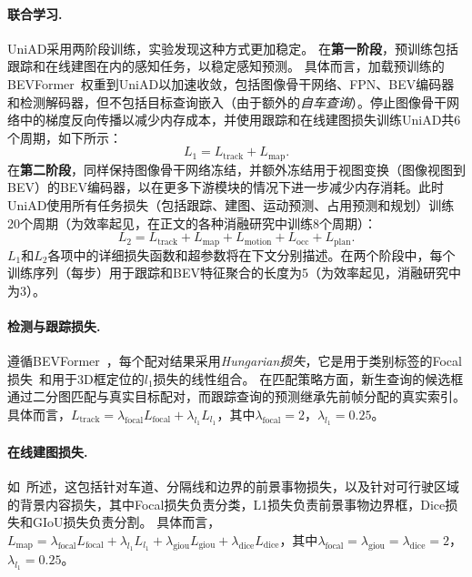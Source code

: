 \documentclass[10pt,twocolumn,letterpaper]{article}
\begin{document}
\paragraph{联合学习.}
UniAD采用两阶段训练，实验发现这种方式更加稳定。
在\textbf{第一阶段}，预训练包括跟踪和在线建图在内的感知任务，以稳定感知预测。
%
具体而言，加载预训练的BEVFormer~\cite{li2022bevformer}权重到UniAD以加速收敛，包括图像骨干网络、FPN、BEV编码器和检测解码器，但不包括目标查询嵌入（由于额外的\textit{自车查询}）。停止图像骨干网络中的梯度反向传播以减少内存成本，并使用跟踪和在线建图损失训练UniAD共6个周期，如下所示：
%
\begin{equation}
\label{eq:all-loss-1}
    L_1 = L_{\text{track}} + L_{\text{map}}.
\end{equation}
%
在\textbf{第二阶段}，同样保持图像骨干网络冻结，并额外冻结用于视图变换（图像视图到BEV）的BEV编码器，以在更多下游模块的情况下进一步减少内存消耗。此时UniAD使用所有任务损失（包括跟踪、建图、运动预测、占用预测和规划）训练20个周期（为效率起见，在正文的各种消融研究中训练8个周期）：
%
\begin{equation}
\label{eq:all-loss}
    L_2 = L_{\text{track}} + L_{\text{map}} + L_{\text{motion}} + L_{\text{occ}} + L_{\text{plan}}.
\end{equation}
%
$L_1$和$L_2$各项中的详细损失函数和超参数将在下文分别描述。在两个阶段中，每个训练序列（每步）用于跟踪和BEV特征聚合\cite{li2022bevformer}的长度为5（为效率起见，消融研究中为3）。


\paragraph{检测与跟踪损失.} 遵循BEVFormer~\cite{li2022bevformer}，每个配对结果采用\textit{Hungarian损失}，它是用于类别标签的Focal损失~\cite{lin2017focal}和用于3D框定位的$l_1$损失的线性组合。
%
在匹配策略方面，新生查询的候选框通过二分图匹配与真实目标配对，而跟踪查询的预测继承先前帧分配的真实索引。
%
具体而言，$L_{\text{track}} = \lambda_{\text{focal}} L_{\text{focal}} + \lambda_{l_1} L_{l_1}$，其中$\lambda_{\text{focal}}\!=\!2$，$\lambda_{l_1}\!=\!0.25$。

\paragraph{在线建图损失.} 如~\cite{li2022panopticseg}所述，这包括针对车道、分隔线和边界的前景事物损失，以及针对可行驶区域的背景内容损失，其中Focal损失负责分类，L1损失负责前景事物边界框，Dice损失和GIoU损失\cite{rezatofighi2019giou}负责分割。
%
具体而言，$L_{\text{map}} = \lambda_{\text{focal}} L_{\text{focal}} + \lambda_{l_1} L_{l_1} + \lambda_{\text{giou}} L_{\text{giou}} + \lambda_{\text{dice}} L_{\text{dice}}$，其中$\lambda_{\text{focal}}\!=\!\lambda_{\text{giou}}\!=\!\lambda_{\text{dice}}\!=\!2$，$\lambda_{l_1}\!=\!0.25$。
\end{document}
